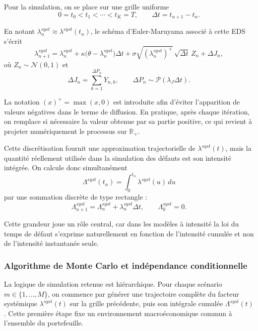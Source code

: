 Pour la simulation, on se place sur une grille uniforme
\begin{equation}
0=t_0<t_1<\cdots<t_K=T,
\qquad
\Delta t=t_{n+1}-t_n.
\end{equation}

En notant $\lambda_n^{syst}\approx \lambda^{syst}(t_n)$, le schéma d'Euler-Maruyama associé à cette EDS s'écrit
\begin{equation}
\lambda_{n+1}^{syst}
=
\lambda_n^{syst}
+
\kappa\bigl(\theta-\lambda_n^{syst}\bigr)\Delta t
+
\sigma\sqrt{(\lambda_n^{syst})^{+}}\,\sqrt{\Delta t}\,Z_n
+
\Delta J_n,
\end{equation}
où $Z_n \sim \mathcal{N}(0,1)$ et
\begin{equation}
\Delta J_n=\sum_{k=1}^{\Delta P_n} Y_{n,k},
\qquad
\Delta P_n \sim \mathcal{P}(\lambda_J \Delta t).
\end{equation}

La notation $(x)^{+}=\max(x,0)$ est introduite afin d'éviter l'apparition de valeurs négatives dans le terme de diffusion. En pratique, après chaque itération, on remplace si nécessaire la valeur obtenue par sa partie positive, ce qui revient à projeter numériquement le processus sur $\mathbb{R}_{+}$.

Cette discrétisation fournit une approximation trajectorielle de $\lambda^{syst}(t)$, mais la quantité réellement utilisée dans la simulation des défauts est son intensité intégrée. On calcule donc simultanément
\begin{equation}
\Lambda^{syst}(t_n)=\int_0^{t_n}\lambda^{syst}(u)\,du
\end{equation}
par une sommation discrète de type rectangle :
\begin{equation}
\Lambda^{syst}_{n+1}
=
\Lambda^{syst}_{n}
+
\lambda_n^{syst}\Delta t,
\qquad
\Lambda^{syst}_0=0.
\end{equation}

Cette grandeur joue un rôle central, car dans les modèles à intensité la loi du temps de défaut s'exprime naturellement en fonction de l'intensité cumulée et non de l'intensité instantanée seule.

\subsubsection{Algorithme de Monte Carlo et indépendance conditionnelle}

La logique de simulation retenue est hiérarchique. Pour chaque scénario $m \in \{1,\dots,M\}$, on commence par générer une trajectoire complète du facteur systémique $\lambda^{syst}(t)$ sur la grille précédente, puis son intégrale cumulée $\Lambda^{syst}(t)$. Cette première étape fixe un environnement macroéconomique commun à l'ensemble du portefeuille.

